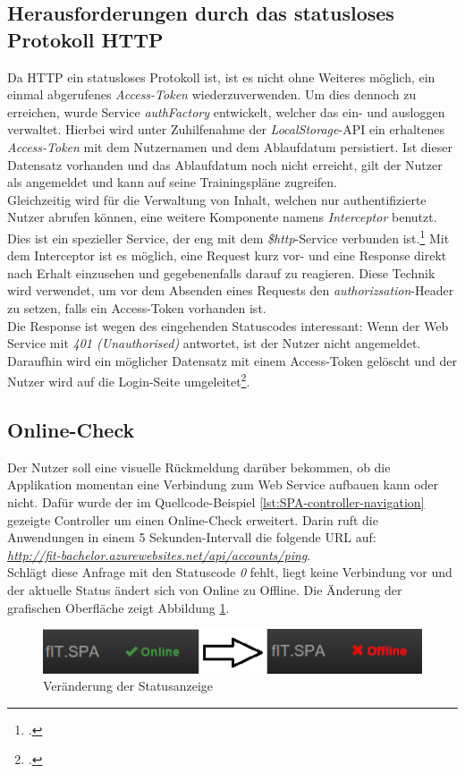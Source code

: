 \subsection{Herausforderungen durch das statusloses Protokoll HTTP}
\label{ssec:statusloses-http}
Da \ac{HTTP} ein statusloses Protokoll ist, ist es nicht ohne Weiteres möglich, ein einmal abgerufenes \textit{Access-Token} wiederzuverwenden. Um dies dennoch zu erreichen, wurde Service \textit{authFactory} entwickelt, welcher  das ein- und ausloggen verwaltet. Hierbei wird unter Zuhilfenahme der \textit{LocalStorage}-\ac{API} ein erhaltenes \textit{Access-Token} mit dem Nutzernamen und dem Ablaufdatum persistiert. Ist dieser Datensatz vorhanden und das Ablaufdatum noch nicht erreicht, gilt der Nutzer als angemeldet und kann auf seine Trainingspläne zugreifen. \\
Gleichzeitig wird für die Verwaltung von Inhalt, welchen nur authentifizierte Nutzer abrufen können, eine weitere Komponente namens \textit{Interceptor} benutzt. Dies ist ein spezieller Service, der eng mit dem \textit{\$http}-Service verbunden ist.\footcite{online:angular:interceptor} Mit dem Interceptor ist es möglich, eine Request kurz vor- und eine Response direkt nach Erhalt einzusehen und gegebenenfalls darauf zu reagieren. Diese Technik wird verwendet, um vor dem Absenden eines Requests den \textit{authorizsation}-Header zu setzen, falls ein Access-Token vorhanden ist. \\ 
Die Response ist wegen des eingehenden Statuscodes interessant: Wenn der Web Service mit \textit{401 (Unauthorised)} antwortet, ist der Nutzer nicht angemeldet. Daraufhin wird ein möglicher Datensatz mit einem Access-Token gelöscht und der Nutzer wird auf die Login-Seite umgeleitet\footcite{online:Created_SPA}. 

\subsection{Online-Check}
\label{ssec:Online-Check}
Der Nutzer soll eine visuelle Rückmeldung darüber bekommen, ob die Applikation momentan eine Verbindung zum Web Service aufbauen kann oder nicht. Dafür wurde der im Quellcode-Beispiel \ref{lst:SPA-controller-navigation} gezeigte Controller um einen Online-Check erweitert. Darin ruft die Anwendungen in einem 5 Sekunden-Intervall die folgende \ac{URL} auf: \\
\textit{\href{http://fit-bachelor.azurewebsites.net/api/accounts/ping}{http://fit-bachelor.azurewebsites.net/api/accounts/ping}}.\\ 
Schlägt diese Anfrage mit den Statuscode \textit{0} fehlt, liegt keine Verbindung vor und der aktuelle Status ändert sich von Online zu Offline. Die Änderung der grafischen Oberfläche zeigt Abbildung \ref{pic:SPA:OnlineCheck:Statusänderung}. 
\begin{figure}[h]
\centering
\includegraphics[width=0.8\linewidth]{content/images/SPA-Online-Check}
\caption{Veränderung der Statusanzeige}
\label{pic:SPA:OnlineCheck:Statusänderung}
\end{figure}
